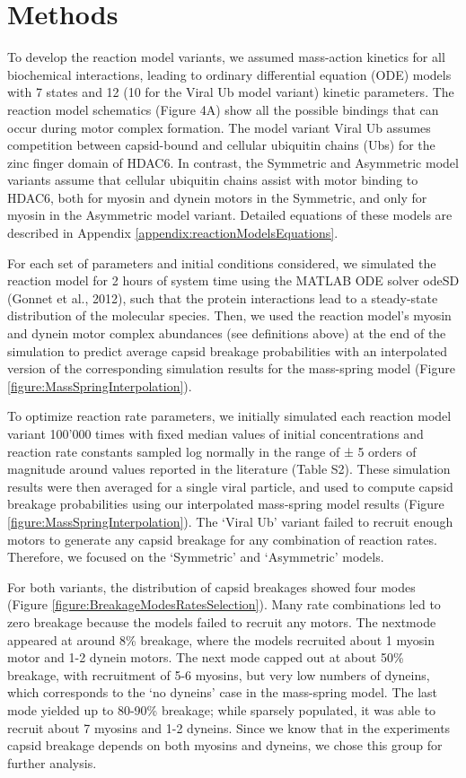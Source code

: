 \section{Methods}

To develop the reaction model variants, we assumed mass-action kinetics for all biochemical interactions, leading to ordinary differential equation (ODE) models with 7 states and 12 (10 for the Viral Ub model variant) kinetic parameters. The reaction model schematics (Figure 4A) show all the possible bindings that can occur during motor complex formation. The model variant Viral Ub assumes competition between capsid-bound and cellular ubiquitin chains (Ubs) for the zinc finger domain of HDAC6. In contrast, the Symmetric and Asymmetric model variants assume that cellular ubiquitin chains assist with motor binding to HDAC6, both for myosin and dynein motors in the Symmetric, and only for myosin in the Asymmetric model variant. Detailed equations of these models are described in Appendix \ref{appendix:reactionModelsEquations}.

For each set of parameters and initial conditions considered, we simulated the reaction model for 2 hours of system time using the MATLAB ODE solver odeSD (Gonnet et al., 2012), such that the protein interactions lead to a steady-state distribution of the molecular species. Then, we used the reaction model’s myosin and dynein motor complex abundances (see definitions above) at the end of the simulation to predict average capsid breakage probabilities with an interpolated version of the corresponding simulation results for the mass-spring model (Figure \ref{figure:MassSpringInterpolation}).

To optimize reaction rate parameters, we initially simulated each reaction model variant 100’000 times with fixed median values of initial concentrations and reaction rate constants sampled log normally in the range of ± 5 orders of magnitude around values reported in the literature (Table S2). These simulation results were then averaged for a single viral particle, and used to compute capsid breakage probabilities using our interpolated mass-spring model results (Figure \ref{figure:MassSpringInterpolation}). The ‘Viral Ub’ variant failed to recruit enough motors to generate any capsid breakage for any combination of reaction rates. Therefore, we focused on the ‘Symmetric’ and ‘Asymmetric’ models.

For both variants, the distribution of capsid breakages showed four modes (Figure \ref{figure:BreakageModesRatesSelection}). Many rate combinations led to zero breakage because the models failed to recruit any motors. The nextmode appeared at around 8\% breakage, where the models recruited about 1 myosin motor and 1-2 dynein motors. The next mode capped out at about 50\% breakage, with recruitment of 5-6 myosins, but very low numbers of dyneins, which corresponds to the ‘no dyneins’ case in the mass-spring model. The last mode yielded up to 80-90\% breakage; while sparsely populated, it was able to recruit about 7 myosins and 1-2 dyneins. Since we know that in the experiments capsid breakage depends on both myosins and dyneins, we chose this group for further analysis.

